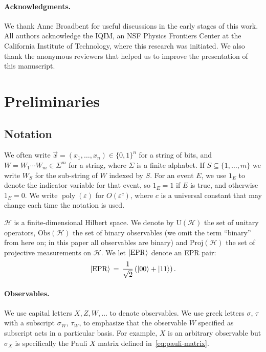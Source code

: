 \documentclass{toc}
\newcommand{\ket}[1]{|#1\rangle}
\newcommand{\setft}[1]{\mathrm{#1}}
\newcommand{\Proj}{\setft{Proj}}
\newcommand{\Obs}{\setft{Obs}}
\newcommand{\Unitary}{\setft{U}}
\DeclareMathOperator{\poly}{poly}
\newcommand{\mH}{\mathcal{H}}
\newcommand{\eps}{\varepsilon}
\newcommand{\EPR}{{\rm EPR}}
\begin{document}
\paragraph{Acknowledgments.} We thank Anne Broadbent for useful discussions in the early stages of this work. All authors acknowledge the IQIM, an NSF Physics Frontiers Center at the California Institute of Technology, where this research was initiated. We also thank the anonymous reviewers that helped us to improve the presentation of this manuscript.






\section{Preliminaries}\label{sec:prelim}


\subsection{Notation}
\label{sec:prelim-notation}

We often write $\vec{x} =(x_1,\ldots,x_n)\in \{0,1\}^n$ for a string of bits, and $W=W_1\cdots W_m\in\Sigma^m$ for a string, where $\Sigma$ is a finite alphabet. If $S\subseteq \{1,\ldots,m\}$ we write $W_S$ for the sub-string of $W$ indexed by $S$. For an event $E$, we use $1_{E}$ to denote the indicator variable for that event, so $1_E=1$ if $E$ is true, and otherwise $1_E=0$. We write $\poly(\eps)$ for $O(\eps^c)$, where $c$ is a universal constant that may change each time the notation is used. 

$\mH$ is a finite-dimensional Hilbert space.  We denote by $\Unitary(\mH)$ the set of unitary operators, $\Obs(\mH)$ the set of binary observables (we omit the term ``binary'' from here on; in this paper all observables are binary) and $\Proj(\mH)$ the set of projective measurements on $\mH$.
We let $\ket{\EPR}$ denote an EPR pair: 
$$\ket{\EPR}\,=\,\frac{1}{\sqrt{2}}\left(\ket{00}+\ket{11}\right).$$


\paragraph{Observables.}
We use capital letters $X,Z,W,\ldots$ to denote observables. We use greek letters $\sigma$, $\tau$ with a subscript $\sigma_W$, $\tau_W$, to emphasize that the observable $W$ specified as subscript acts in a particular basis. For example, $X$ is an arbitrary observable but $\sigma_X$ is specifically the Pauli $X$ matrix defined in~\eqref{eq:pauli-matrix}.
\end{document}
